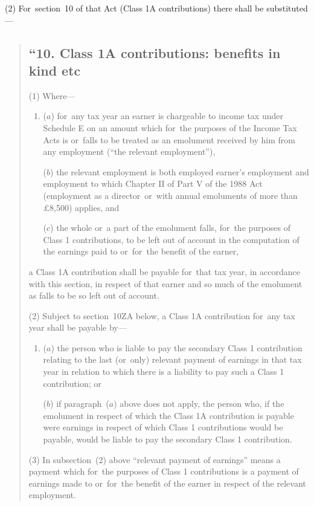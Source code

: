 \documentclass[12pt,a4paper]{article}
\begin{document}
(2) For~section~10 of that Act (Class 1A contributions) there shall be substituted—
\begin{quotation}
\subsection*{“10. Class 1A contributions: benefits in kind etc}

(1) Where—
\begin{enumerate}\item[]
($a$) for~any tax year an earner is chargeable to income tax under Schedule E on an amount which for~the purposes of the Income Tax Acts is or~falls to be treated as an emolument received by him from any employment (“the relevant employment”),

($b$) the relevant employment is both employed earner’s employment and employment to which Chapter II of Part V of the 1988 Act (employment as a director~or~with annual emoluments of more than £8,500) applies, and

($c$) the whole or~a part of the emolument falls, for~the purposes of Class 1 contributions, to be left out of account in the computation of the earnings paid to or~for~the benefit of the earner,
\end{enumerate}
a Class 1A contribution shall be payable for~that tax year, in accordance with this section, in respect of that earner and so much of the emolument as falls to be so left out of account.

(2) Subject to section~10ZA below, a Class 1A contribution for~any tax year shall be payable by—
\begin{enumerate}\item[]
($a$) the person who is liable to pay the secondary Class 1 contribution relating to the last (or~only) relevant payment of earnings in that tax year in relation to which there is a liability to pay such a Class 1 contribution; or

($b$) if paragraph~($a$)  above does not apply, the person who, if the emolument in respect of which the Class 1A contribution is payable were earnings in respect of which Class 1 contributions would be payable, would be liable to pay the secondary Class 1 contribution.
\end{enumerate}

(3) In subsection~(2)  above “relevant payment of earnings” means a payment which for~the purposes of Class 1 contributions is a payment of earnings made to or~for~the benefit of the earner in respect of the relevant employment.


\end{quotation}
\end{document}
